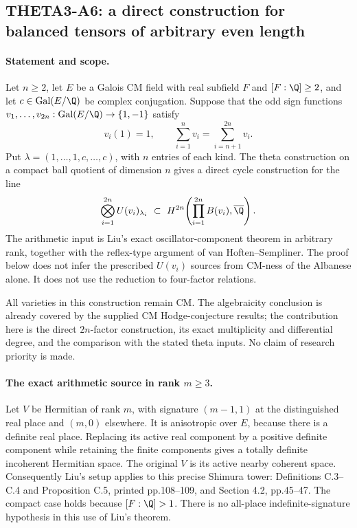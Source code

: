 
\subsection{THETA3-A6: a direct construction for balanced tensors of arbitrary even length}\label{A6}

\paragraph{Statement and scope.}
Let $n\geq2$, let $E$ be a Galois CM field with real subfield $F$
and $[F:\Q]\geq2$, and let $c\in\operatorname{Gal}(E/\Q)$ be complex
conjugation. Suppose that the odd sign functions
$v_1,\ldots,v_{2n}:\operatorname{Gal}(E/\Q)\to\{1,-1\}$ satisfy
\begin{equation}\label{A6-balance}
 v_i(1)=1,\qquad \sum_{i=1}^n v_i=\sum_{i=n+1}^{2n}v_i.
\end{equation}
Put $\lambda=(1,\ldots,1,c,\ldots,c)$, with $n$ entries of each kind.
The theta construction on a compact ball quotient of dimension $n$
gives a direct cycle construction for the line
\begin{equation}\label{A6-line}
 \bigotimes_{i=1}^{2n}U(v_i)_{\lambda_i}
 \ \subset\ H^{2n}\!\left(\prod_{i=1}^{2n}B(v_i),\overline\Q\right).
\end{equation}
The arithmetic input is Liu's exact oscillator-component theorem in
arbitrary rank, together with the reflex-type argument of
van Hoften--Sempliner. The proof below does not infer the prescribed
$U(v_i)$ sources from CM-ness of the Albanese alone. It does not use
the reduction to four-factor relations.

All varieties in this construction remain CM. The algebraicity
conclusion is already covered by the supplied CM Hodge-conjecture
results; the contribution here is the direct $2n$-factor construction,
its exact multiplicity and differential degree, and the comparison
with the stated theta inputs. No claim of research priority is made.

\paragraph{The exact arithmetic source in rank $m\geq3$.}
Let $V$ be Hermitian of rank $m$, with signature $(m-1,1)$ at the
distinguished real place and $(m,0)$ elsewhere. It is anisotropic
over $E$, because there is a definite real place. Replacing its active
real component by a positive definite component while retaining the
finite components gives a totally definite incoherent Hermitian
space. The original $V$ is its active nearby coherent space.
Consequently Liu's setup applies to this precise Shimura tower:
Definitions C.3--C.4 and Proposition C.5, printed pp.108--109, and
Section 4.2, pp.45--47. The compact case holds because $[F:\Q]>1$.
There is no all-place indefinite-signature hypothesis in this use
of Liu's theorem.

